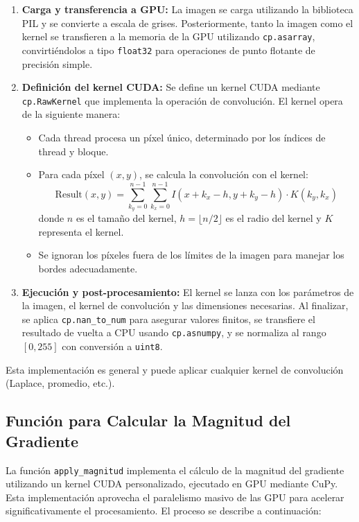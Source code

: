 \documentclass{pas}
\begin{document}
\begin{enumerate}
    \item \textbf{Carga y transferencia a GPU:} La imagen se carga utilizando la biblioteca PIL y se convierte a escala de grises. Posteriormente, tanto la imagen como el kernel se transfieren a la memoria de la GPU utilizando \texttt{cp.asarray}, convirtiéndolos a tipo \texttt{float32} para operaciones de punto flotante de precisión simple.
    
    \item \textbf{Definición del kernel CUDA:} Se define un kernel CUDA mediante \texttt{cp.RawKernel} que implementa la operación de convolución. El kernel opera de la siguiente manera:
    \begin{itemize}
        \item Cada thread procesa un píxel único, determinado por los índices de thread y bloque.
        \item Para cada píxel $(x, y)$, se calcula la convolución con el kernel:
        \[
        \text{Result}(x, y) = \sum_{k_y=0}^{n-1} \sum_{k_x=0}^{n-1} I(x + k_x - h, y + k_y - h) \cdot K(k_y, k_x)
        \]
        donde $n$ es el tamaño del kernel, $h = \lfloor n/2 \rfloor$ es el radio del kernel y $K$ representa el kernel.
        \item Se ignoran los píxeles fuera de los límites de la imagen para manejar los bordes adecuadamente.
    \end{itemize}
    \item \textbf{Ejecución y post-procesamiento:} El kernel se lanza con los parámetros de la imagen, el kernel de convolución y las dimensiones necesarias. Al finalizar, se aplica \texttt{cp.nan\_to\_num} para asegurar valores finitos, se transfiere el resultado de vuelta a CPU usando \texttt{cp.asnumpy}, y se normaliza al rango $[0, 255]$ con conversión a \texttt{uint8}.
\end{enumerate}

Esta implementación es general y puede aplicar cualquier kernel de convolución (Laplace, promedio, etc.).

\subsection{Función para Calcular la Magnitud del Gradiente}

La función \texttt{apply\_magnitud} implementa el cálculo de la magnitud del gradiente utilizando un kernel CUDA personalizado, ejecutado en GPU mediante CuPy. Esta implementación aprovecha el paralelismo masivo de las GPU para acelerar significativamente el procesamiento. El proceso se describe a continuación:
\end{document}
